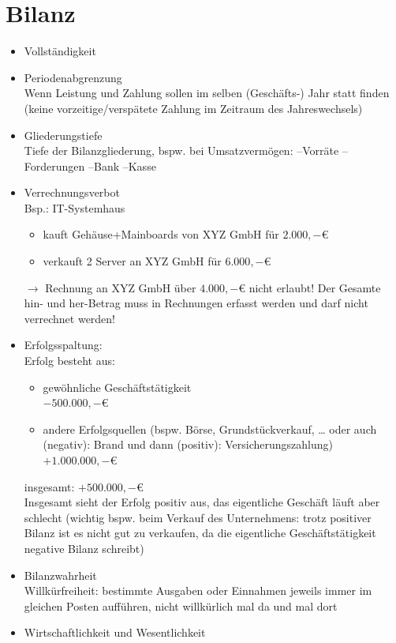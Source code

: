 \section{Bilanz}
\begin{itemize}
\item Vollständigkeit
\item Periodenabgrenzung\\
Wenn Leistung und Zahlung sollen im selben (Geschäfts-) Jahr statt finden (keine vorzeitige/verspätete Zahlung im Zeitraum des Jahreswechsels)
\item Gliederungstiefe\\
Tiefe der Bilanzgliederung, bspw. bei Umsatzvermögen: --Vorräte --Forderungen --Bank --Kasse
\item Verrechnungsverbot\\
Bsp.: IT-Systemhaus 
\begin{itemize}
\item kauft Gehäuse+Mainboards von XYZ GmbH für $2.000,-$\euro{}
\item verkauft 2 Server an XYZ GmbH für $6.000,-$\euro{}
\end{itemize}
$\to$ Rechnung an XYZ GmbH über $4.000,-$\euro{} nicht erlaubt! Der Gesamte hin- und her-Betrag muss in Rechnungen erfasst werden und darf nicht verrechnet werden!
\item Erfolgsspaltung:\\
Erfolg besteht aus:
\begin{itemize}
\item gewöhnliche Geschäftstätigkeit\\
$-500.000,-$\euro{}
\item andere Erfolgsquellen (bspw. Börse, Grundstückverkauf, … oder auch (negativ): Brand und dann (positiv): Versicherungszahlung)\\
$+1.000.000,-$\euro{}
\end{itemize}
insgesamt: $+500.000,-$\euro{}\\
Insgesamt sieht der Erfolg positiv aus, das eigentliche Geschäft läuft aber schlecht (wichtig bspw. beim Verkauf des Unternehmens: trotz positiver Bilanz ist es nicht gut zu verkaufen, da die eigentliche Geschäftstätigkeit negative Bilanz schreibt)
\item Bilanzwahrheit\\
Willkürfreiheit: bestimmte Ausgaben oder Einnahmen jeweils immer im gleichen Posten aufführen, nicht willkürlich mal da und mal dort
\item Wirtschaftlichkeit und Wesentlichkeit\\

\end{itemize}
